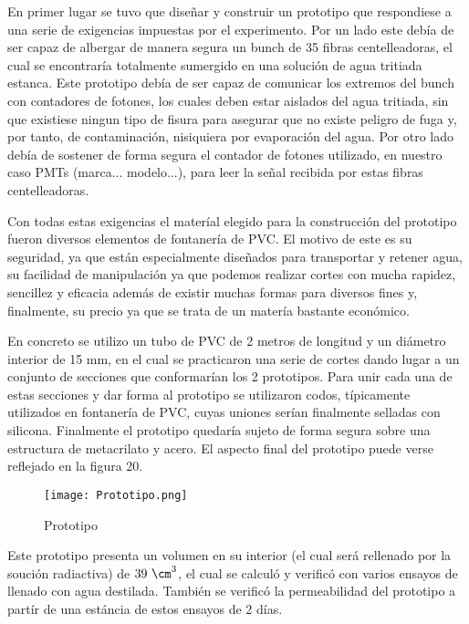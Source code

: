 En primer lugar se tuvo que diseñar y construir un prototipo que respondiese a una serie de exigencias impuestas por el experimento. Por un lado este debía de ser capaz de albergar de manera segura  un bunch de 35 fibras centelleadoras, el cual se encontraría totalmente sumergido en una solución de agua tritiada estanca. Este prototipo debía de ser capaz de comunicar los extremos del bunch con contadores de fotones, los cuales deben estar aislados del agua tritiada, sin que existiese ningun tipo de fisura para asegurar que no existe peligro de fuga y, por tanto, de contaminación, nisiquiera por evaporación del agua. Por otro lado debía de sostener de forma segura el contador de fotones utilizado, en nuestro caso PMTs (marca... modelo...), para leer la señal recibida por estas fibras centelleadoras.

Con todas estas exigencias el materíal elegido para la construcción del prototipo fueron diversos elementos de fontanería de PVC. El motivo de este es su seguridad, ya que están especialmente diseñados para transportar y retener agua, su facilidad de manipulación ya que podemos realizar cortes con mucha rapidez, sencillez y eficacia además de existir muchas formas para diversos fines y, finalmente, su precio ya que se trata de un matería bastante económico. 

En concreto se utilizo un tubo de PVC de 2 metros de longitud y un diámetro interior de 15 mm, en el cual se practicaron una serie de cortes dando lugar a un conjunto de secciones que conformarían los 2 prototipos. Para unir cada una de estas secciones y dar forma al prototipo se utilizaron codos, típicamente utilizados en fontanería de PVC, cuyas uniones serían finalmente selladas con silicona. Finalmente el prototipo quedaría sujeto de forma segura sobre una estructura de metacrilato y acero. El aspecto final del prototipo puede verse reflejado en la figura 20.

\begin{figure}[hbtp]
\centering
\texttt{[image: Prototipo.png]}
\caption{ Prototipo}
\end{figure}

Este prototipo presenta un volumen en su interior (el cual será rellenado por la soución radiactiva) de $39~\cm^3$, el cual se calculó y verificó con varios ensayos de llenado con agua destilada. También se verificó la permeabilidad del prototipo a partír de una estáncia de estos ensayos de 2 días. 

